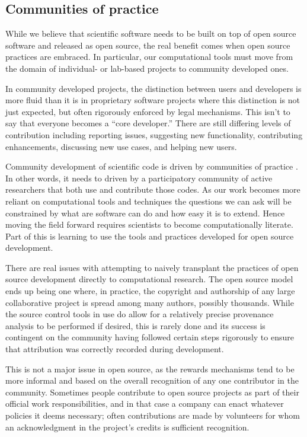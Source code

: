 \documentclass[ChapterTOCs,krantz2]{krantz} %
\begin{document}
\subsection{\label{subsec:community}Communities of practice}

While we believe that scientific software needs to be built on top of open
source software and released as open source, the real benefit comes when open
source practices are embraced. In particular, our computational tools must move
from the domain of individual- or lab-based projects to community developed
ones.

In community developed projects, the distinction between users and developers
is more fluid than it is in proprietary software projects where this
distinction is not just expected, but often rigorously enforced by legal
mechanisms. This isn't to say that everyone becomes a ``core developer.'' There
are still differing levels of contribution including reporting issues,
suggesting new functionality, contributing enhancements, discussing new use
cases, and helping new users.

Community development of scientific code is driven by communities of practice
\cite{turk2013scale}. In other words, it needs to driven by a participatory
community of active researchers that both use and contribute those codes. As
our work becomes more reliant on computational tools and techniques the
questions we can ask will be constrained by what are software can do and how
easy it is to extend. Hence moving the field forward requires scientists to
become computationally literate. Part of this is learning to use the tools and
practices developed for open source development.

There are real issues with attempting to naively transplant the practices of
open source development directly to computational research. The open source
model ends up being one where, in practice, the copyright and authorship of any
large collaborative project is spread among many authors, possibly thousands.
While the source control tools in use do allow for a relatively precise
provenance analysis to be performed if desired, this is rarely done and its
success is contingent on the community having followed certain steps rigorously
to ensure that attribution was correctly recorded during development.

This is not a major issue in open source, as the rewards mechanisms tend to be
more informal and based on the overall recognition of any one contributor in
the community. Sometimes people contribute to open source projects as part of
their official work responsibilities, and in that case a company can enact
whatever policies it deems necessary; often contributions are made by
volunteers for whom an acknowledgment in the project's credits is sufficient
recognition.
\end{document}
